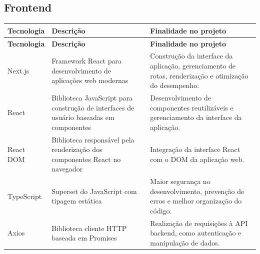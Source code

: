 \documentclass[12pt]{article}
\begin{document}
\subsection{Frontend}

\begin{longtable}{|p{3cm}|p{4.2cm}|p{7cm}|}
  \hline
  \textbf{Tecnologia}                                                                    & \textbf{Descrição} & \textbf{Finalidade no projeto} \\
  \hline
  \endfirsthead

  \hline
  \textbf{Tecnologia}                                                                    & \textbf{Descrição} & \textbf{Finalidade no projeto} \\
  \hline
  \endhead

  Next.js                                                                                &
  Framework React para desenvolvimento de aplicações web modernas                        &
  Construção da interface da aplicação, gerenciamento de rotas, renderização e otimização do desempenho.                                       \\
  \hline

  React                                                                                  &
  Biblioteca JavaScript para construção de interfaces de usuário baseadas em componentes &
  Desenvolvimento de componentes reutilizáveis e gerenciamento da interface da aplicação.                                                      \\
  \hline

  React DOM                                                                              &
  Biblioteca responsável pela renderização dos componentes React no navegador            &
  Integração da interface React com o DOM da aplicação web.                                                                                    \\
  \hline

  TypeScript                                                                             &
  Superset do JavaScript com tipagem estática                                            &
  Maior segurança no desenvolvimento, prevenção de erros e melhor organização do código.                                                       \\
  \hline

  Axios                                                                                  &
  Biblioteca cliente HTTP baseada em Promises                                            &
  Realização de requisições à API backend, como autenticação e manipulação de dados.                                                           \\
  \hline


\end{longtable}
\end{document}
